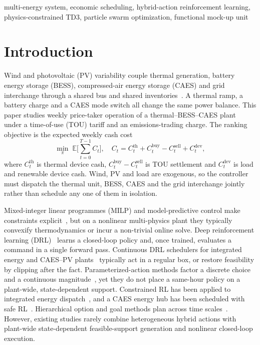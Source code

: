 \documentclass[conference]{IEEEtran}
\begin{document}
\begin{IEEEkeywords}
multi-energy system, economic scheduling, hybrid-action reinforcement learning, physics-constrained TD3, particle swarm optimization, functional mock-up unit
\end{IEEEkeywords}

\section{Introduction}
\label{sec:introduction}

Wind and photovoltaic (PV) variability couple thermal generation, battery energy storage (BESS), compressed-air energy storage (CAES) and grid interchange through a shared bus and shared inventories~\cite{zhou2023iesdrl,yang2024planning}. A thermal ramp, a battery charge and a CAES mode switch all change the same power balance. This paper studies weekly price-taker operation of a thermal--BESS--CAES plant~\cite{emmanuel2020market,pei2024pricetaker} under a time-of-use (TOU) tariff and an emissions-trading charge. The ranking objective is the expected weekly cash cost
\begin{equation}
\min_{\pi}\;
\mathbb{E}\Biggl[\sum_{t=0}^{T-1} C_t\Biggr],
\quad
C_t
=
C_t^{\mathrm{th}}
+C_t^{\mathrm{buy}}
-C_t^{\mathrm{sell}}
+C_t^{\mathrm{dev}},
\label{eq:C}
\end{equation}
where \(C_t^{\mathrm{th}}\) is thermal device cash, \(C_t^{\mathrm{buy}}-C_t^{\mathrm{sell}}\) is TOU settlement and \(C_t^{\mathrm{dev}}\) is load and renewable device cash. Wind, PV and load are exogenous, so the controller must dispatch the thermal unit, BESS, CAES and the grid interchange jointly rather than schedule any one of them in isolation.

Mixed-integer linear programmes (MILP) and model-predictive control make constraints explicit~\cite{cui2025ghtd3,ceusters2021mpcrl}, but on a nonlinear multi-physics plant they typically convexify thermodynamics or incur a non-trivial online solve. Deep reinforcement learning (DRL)~\cite{sutton2018rl,lillicrap2016ddpg,fujimoto2018td3,haarnoja2018sac} learns a closed-loop policy and, once trained, evaluates a command in a single forward pass. Continuous DRL schedulers for integrated energy and CAES--PV plants~\cite{zhou2023iesdrl,li2025iesdrl,wu2024pricing,sun2024constrained,dolatabadi2023caes} typically act in a regular box, or restore feasibility by clipping after the fact. Parameterized-action methods factor a discrete choice and a continuous magnitude~\cite{hausknecht2016pas,masson2016paa,fan2019hybrid}, yet they do not place a same-hour policy on a plant-wide, state-dependent support. Constrained RL has been applied to integrated energy dispatch~\cite{sun2024constrained}, and a CAES energy hub has been scheduled with safe RL~\cite{garmroodi2023caes}. Hierarchical option and goal methods plan across time scales~\cite{cui2024caesbess,cui2025ghtd3,jendoubi2023hier,ochoa2024bidding}. However, existing studies rarely combine heterogeneous hybrid actions with plant-wide state-dependent feasible-support generation and nonlinear closed-loop execution.
\end{document}
